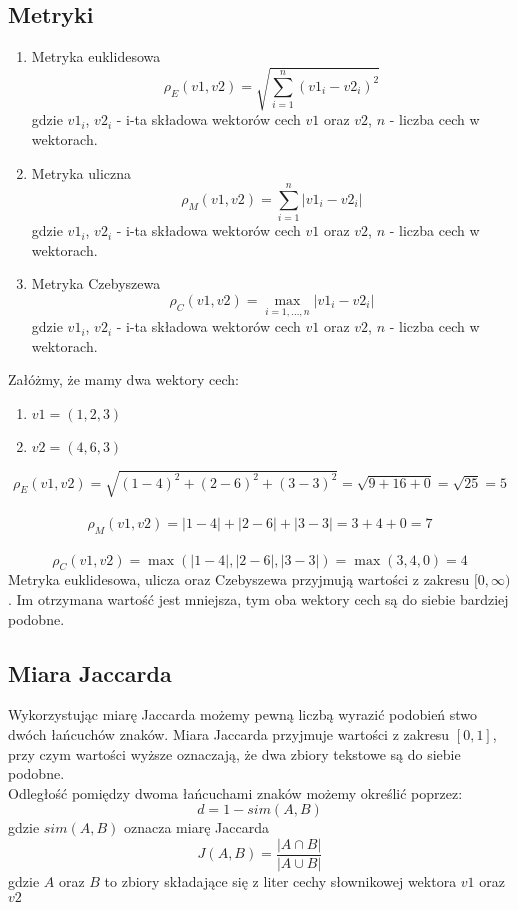 \documentclass{article}
\begin{document}
\subsection{Metryki}
\begin{enumerate}
    \item Metryka euklidesowa
        \begin{equation}
      \rho_E(v1, v2) = \sqrt{\sum_{i=1}^{n} (v1_i - v2_i)^2}  
        \end{equation}
        gdzie \(v1_i\), \(v2_i\) - i-ta składowa wektorów cech \(v1\) oraz \(v2\), \(n\) - liczba cech w wektorach.
    \item Metryka uliczna
        \begin{equation}
          \rho_M(v1, v2) = \sum_{i=1}^{n} |v1_i - v2_i|
        \end{equation}
        gdzie \(v1_i\), \(v2_i\) - i-ta składowa wektorów cech \(v1\) oraz \(v2\), \(n\) - liczba cech w wektorach.
    \item Metryka Czebyszewa
        \begin{equation}
          \rho_C(v1, v2) = \max_{i = 1,...,n} |v1_i - v2_i|
        \end{equation}
        gdzie \(v1_i\), \(v2_i\) - i-ta składowa wektorów cech \(v1\) oraz \(v2\), \(n\) - liczba cech w wektorach. \\
\end{enumerate}
Załóżmy, że mamy dwa wektory cech:
\begin{enumerate}
    \item \(v1 = (1, 2, 3)\)
    \item \(v2 = (4, 6, 3)\)
\end{enumerate}
\[
     \rho_E(v1, v2) = \sqrt{(1-4)^2 + (2-6)^2 + (3-3)^2} = \sqrt{9 + 16 + 0} = \sqrt{25} = 5
\] \\
\[
    \rho_M(v1, v2) = |1-4| + |2-6| + |3-3| = 3 + 4 + 0 = 7
\] \\ 
\[
    \rho_C(v1, v2) = \max(|1-4|, |2-6|, |3-3|) = \max(3, 4, 0) = 4
 \]
Metryka euklidesowa, ulicza oraz Czebyszewa przyjmują wartości z zakresu \([0, \infty)\). Im otrzymana wartość jest mniejsza, tym oba wektory cech są do siebie bardziej podobne.

\subsection{Miara Jaccarda}
Wykorzystując miarę Jaccarda możemy pewną liczbą wyrazić podobień
stwo dwóch łańcuchów znaków. Miara Jaccarda przyjmuje wartości z zakresu \([0,1]\), przy czym wartości wyższe oznaczają, że dwa zbiory tekstowe są do siebie podobne. \\
Odległość pomiędzy dwoma łańcuchami znaków możemy określić poprzez:
\begin{equation}
    d = 1 - sim(A, B)
\end{equation}
gdzie \(sim(A,B)\) oznacza miarę Jaccarda
\begin{equation}
    J(A, B) = \frac{|A \cap B|}{|A \cup B|}
\end{equation}
gdzie \(A\) oraz \(B\) to zbiory składające się z liter cechy słownikowej wektora \(v1\) oraz \(v2\) \\
\end{document}

